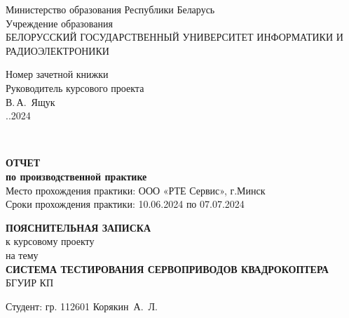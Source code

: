 
\begin{titlepage}
\begin{center}
Министерство образования Республики Беларусь\\[1.2em]
Учреждение образования\\[0.4em]
БЕЛОРУССКИЙ ГОСУДАРСТВЕННЫЙ УНИВЕРСИТЕТ ИНФОРМАТИКИ И РАДИОЭЛЕКТРОНИКИ\\[2.0em]
\end{center}

\begin{flushright}
  \begin{minipage}{0.5\textwidth}
    Номер зачетной книжки\\
    Руководитель курсового проекта\\

    \underline{\hspace*{2.8cm}} В.\,А.~Ящук\\
    \underline{\hspace*{1.4cm}}.\underline{\hspace*{1.4cm}}.2024
  \end{minipage}\\[2em]
\end{flushright}

\begin{center}
\textbf{ОТЧЕТ}\\
\textbf{по производственной практике}\\
Место прохождения практики: ООО «РТЕ Сервис», г.Минск\\
Сроки прохождения практики: 10.06.2024 по 07.07.2024\\
\end{center}

\begin{center}
  \textbf{ПОЯСНИТЕЛЬНАЯ ЗАПИСКА}\\
  к курсовому проекту\\
  на тему\\[2.0em]

  \textbf{СИСТЕМА ТЕСТИРОВАНИЯ СЕРВОПРИВОДОВ КВАДРОКОПТЕРА}\\
  БГУИР КП%
\end{center}

\begin{flushright}
    \begin{minipage}{9.3cm}
        Студент:  гр. 112601 Корякин~А.~Л.\\[0.1em]


\end{minipage}
\end{flushright}
\end{titlepage}

